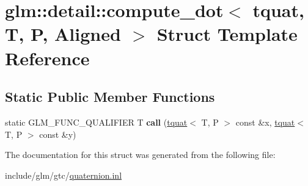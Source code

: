 \hypertarget{structglm_1_1detail_1_1compute__dot_3_01tquat_00_01T_00_01P_00_01Aligned_01_4}{}\section{glm\+:\+:detail\+:\+:compute\+\_\+dot$<$ tquat, T, P, Aligned $>$ Struct Template Reference}
\label{structglm_1_1detail_1_1compute__dot_3_01tquat_00_01T_00_01P_00_01Aligned_01_4}
\subsection*{Static Public Member Functions}
\begin{DoxyCompactItemize}
\item 
\mbox{\label{structglm_1_1detail_1_1compute__dot_3_01tquat_00_01T_00_01P_00_01Aligned_01_4_aba8389412ddb78fa5ee6775625caa21e}} 
static G\+L\+M\+\_\+\+F\+U\+N\+C\+\_\+\+Q\+U\+A\+L\+I\+F\+I\+ER T {\bfseries call} (\hyperlink{structglm_1_1tquat}{tquat}$<$ T, P $>$ const \&x, \hyperlink{structglm_1_1tquat}{tquat}$<$ T, P $>$ const \&y)
\end{DoxyCompactItemize}


The documentation for this struct was generated from the following file\+:\begin{DoxyCompactItemize}
\item 
include/glm/gtc/\hyperlink{gtc_2quaternion_8inl}{quaternion.\+inl}\end{DoxyCompactItemize}
